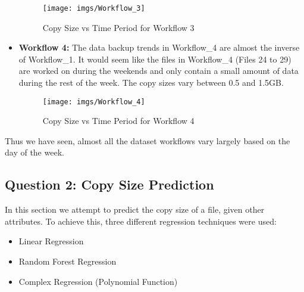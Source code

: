 \documentclass[letterpaper,twocolumn,10pt]{article}
\begin{document}
\begin{itemize}
\begin{figure}[H]
  \texttt{[image: imgs/Workflow\_3]}
  \caption{Copy Size vs Time Period for Workflow 3}
  \label{fig:Workflow3}
\end{figure}
\item\textbf{Workflow 4:} The data backup trends in Workflow\_4 are almost the inverse of Workflow\_1. It would seem like the files in Workflow\_4 (Files 24 to 29) are worked on during the weekends and only contain a small amount of data during the rest of the week. The copy sizes vary between 0.5 and 1.5GB.
\begin{figure}[H]
  \texttt{[image: imgs/Workflow\_4]}
  \caption{Copy Size vs Time Period for Workflow 4}
  \label{fig:Workflow4}
\end{figure}
\end{itemize}
Thus we have seen, almost all the dataset workflows vary largely based on the day of the week.

\subsection{Question 2: Copy Size Prediction}
In this section we attempt to predict the copy size of a file, given other attributes. To achieve this, three different regression techniques were used:
\begin{itemize}
\item Linear Regression
\item Random Forest Regression
\item Complex Regression (Polynomial Function)
\end{itemize}
\end{document}
